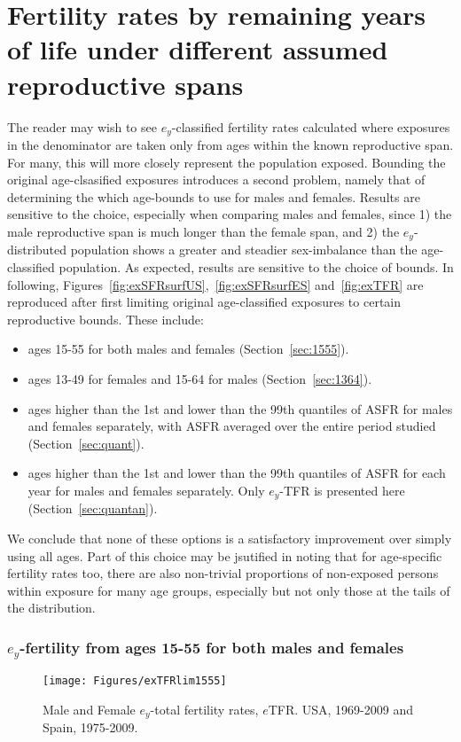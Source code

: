 % 

\chapter{Fertility rates by remaining years of life under different assumed
reproductive spans}
\label{Appendix:reprospans}
The reader may wish to see $e_y$-classified fertility rates calculated
where exposures in the denominator are taken only from ages within the known
reproductive span. For many, this will more closely represent the population exposed. Bounding the
original age-clsasified exposures introduces a second problem, namely that of
determining the which age-bounds to use for males and females. Results are
sensitive to the choice, especially when comparing males and females, since 1)
the male reproductive span is much longer than the female span, and 2) the
$e_y$-distributed population shows a greater and steadier sex-imbalance than the
age-classified population. As expected, results are sensitive to the choice of
bounds. In following, Figures~\ref{fig:exSFRsurfUS},~\ref{fig:exSFRsurfES}
and~\ref{fig:exTFR} are reproduced after first limiting original
age-classified exposures to certain reproductive bounds. These include:

\begin{itemize}
  \item ages 15-55 for both males and females (Section~\ref{sec:1555}).
  \item ages 13-49 for females and 15-64 for males (Section~\ref{sec:1364}).
  \item ages higher than the 1st and lower than the 99th
  quantiles of ASFR for males and females separately, with ASFR averaged over the entire period
  studied (Section~\ref{sec:quant}).
  \item ages higher than the 1st and lower than the
  99th quantiles of ASFR for each year for males and females separately. Only
  $e_y$-TFR is presented here (Section~\ref{sec:quantan}).
\end{itemize}

We conclude that none of these options is a satisfactory improvement over simply
using all ages. Part of this choice may be jsutified in noting that for
age-specific fertility rates too, there are also non-trivial proportions of
non-exposed persons within exposure for many age groups, especially but not only
those at the tails of the distribution.
\pagebreak

\subsection{$e_y$-fertility from ages 15-55 for both males and females}
\begin{figure}[ht!]
        \centering  
          \caption{Male and Female $e_y$-total fertility rates, $e$TFR. USA, 1969-2009 and Spain, 1975-2009.}
           \texttt{[image: Figures/exTFRlim1555]}
          \label{fig:exTFRlim15_55}
\end{figure}

